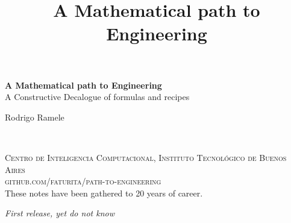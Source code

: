 \documentclass[11pt,fleqn]{book} %
\begin{document}
\title{A Mathematical path to Engineering}


\begingroup
\thispagestyle{empty}
\centering
\vspace*{5cm}
\par\normalfont\fontsize{35}{35}\sffamily\selectfont
\textbf{A Mathematical path to Engineering}\\
{\LARGE A Constructive Decalogue of formulas and recipes}\par %
\vspace*{1cm}
{\Huge Rodrigo Ramele}\par %
\endgroup


\newpage
~\vfill
\thispagestyle{empty}


\noindent \textsc{Centro de Inteligencia Computacional, Instituto Tecnológico de Buenos Aires}\\

\noindent \textsc{github.com/faturita/path-to-engineering}\\ %

\noindent These notes have been gathered to 20 years of career.

\noindent \textit{First release, yet do not know} %



\pagestyle{empty} %

\tableofcontents %

\end{document}

